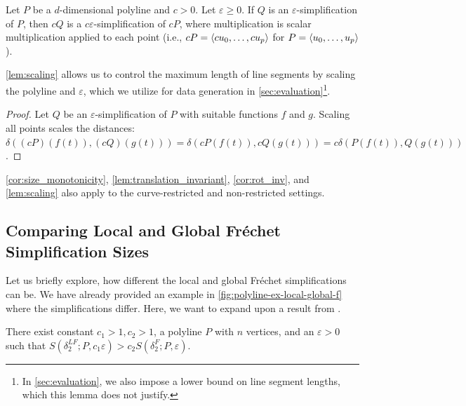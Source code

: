 \begin{lemma}\label{lem:scaling}
	Let \(P\) be a \(d\)-dimensional polyline and \(c > 0\). Let \(\varepsilon \geq 0\). If \(Q\) is an \(\varepsilon\)-simplification of \(P\), then \(cQ\) is a \(c\varepsilon\)-simplification of \(cP\), where multiplication is scalar multiplication applied to each point (i.e., \(cP = \left\langle cu_0, \dots, cu_p\right\rangle\) for \(P = \left\langle u_0,\dots, u_p\right\rangle\)).
\end{lemma}

\cref{lem:scaling} allows us to control the maximum length of line segments by scaling the polyline and \(\varepsilon\), which we utilize for data generation in \cref{sec:evaluation}\footnote{In \cref{sec:evaluation}, we also impose a lower bound on line segment lengths, which this lemma does not justify.}.

\begin{proof}
	Let \(Q\) be an \(\varepsilon\)-simplification of \(P\) with suitable functions \(f\) and \(g\). Scaling all points scales the distances: \(\delta((cP)(f(t)), (cQ)(g(t))) = \delta(cP(f(t)), cQ(g(t))) = c\delta(P(f(t)), Q(g(t)))\).
\end{proof}

\begin{remark}
	\cref{cor:size_monotonicity}, \cref{lem:translation_invariant}, \cref{cor:rot_inv}, and \cref{lem:scaling} also apply to the curve-restricted and non-restricted settings.
\end{remark}

\subsection{Comparing Local and Global Fréchet Simplification Sizes}
Let us briefly explore, how different the local and global Fréchet simplifications can be. We have already provided an example in \cref{fig:polyline-ex-local-global-f} where the simplifications differ. Here, we want to expand upon a result from \citeauthor{on_optimal_polyline_simplification_using_the_hausdorff_and_frechet_distance}. 

\begin{theorem}
	There exist constant \(c_1 > 1, c_2 > 1\), a polyline \(P\) with \(n\) vertices, and an \(\varepsilon > 0\) such that \(S(\delta^{LF}_2; P, c_1 \varepsilon) > c_2 S(\delta^F_2; P, \varepsilon)\).
\end{theorem}

